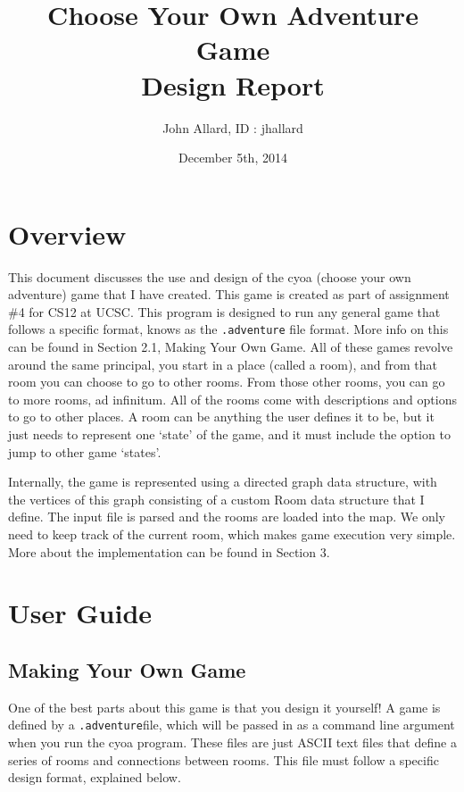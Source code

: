 \documentclass[a4paper,11pt]{article}
\title{ Choose Your Own Adventure Game \\ Design Report \\[7 in]}
\author{ John Allard, ID : jhallard }
\date{December 5th, 2014}
\begin{document}
\maketitle
\tableofcontents
\newpage
 

\section{Overview}
This document discusses the use and design of the cyoa (choose your own adventure) game that I have created. This game is created as part of assignment \#4 for CS12 at UCSC. This program is designed to run any general game that follows a specific format, knows as the \texttt{.adventure} file format. More info on this can be found in Section 2.1, Making Your Own Game. All of these games revolve around the same principal, you start in a place (called a room), and from that room you can choose to go to other rooms. From those other rooms, you can go to more rooms, ad infinitum. All of the rooms come with descriptions and options to go to other places. A room can be anything the user defines it to be, but it just needs to represent one `state' of the game, and it must include the option to jump to other game `states'. \par
Internally, the game is represented using a directed graph data structure, with the vertices of this graph consisting of a custom Room data structure that I define. The input file is parsed and the rooms are loaded into the map. We only need to keep track of the current room, which makes game execution very simple. More about the implementation can be found in Section 3.

\section{User Guide}

    \subsection{Making Your Own Game}
    One of the best parts about this game is that you design it yourself! A game is defined by a \texttt{.adventure}file, which will be passed in as a command line argument when you run the cyoa program. These files are just ASCII text files that define a series of rooms and connections between rooms. This file must follow a specific design format, explained below. \\
\end{document}
